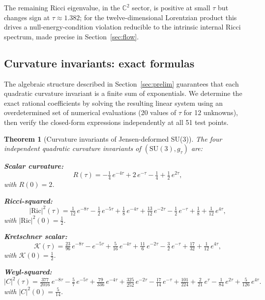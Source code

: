 \documentclass[12pt]{article}
\newtheorem{theorem}{Theorem}
\theoremstyle{definition}
\theoremstyle{remark}
\begin{document}
The remaining Ricci eigenvalue, in the $\mathbb{C}^2$ sector, is positive at small $\tau$ but changes sign at $\tau\approx1.382$; for the twelve-dimensional Lorentzian product this drives a null-energy-condition violation reducible to the intrinsic internal Ricci spectrum, made precise in Section~\ref{sec:flow}.

\subsection{Curvature invariants: exact formulas}

The algebraic structure described in Section~\ref{sec:prelim} guarantees that each quadratic curvature invariant is a finite sum of exponentials.  We determine the exact rational coefficients by solving the resulting linear system using an overdetermined set of numerical evaluations (20 values of $\tau$ for 12 unknowns), then verify the closed-form expressions independently at all 51 test points.

\begin{theorem}[Curvature invariants of Jensen-deformed SU(3)]
\label{thm:invariants}
The four independent quadratic curvature invariants of $(\mathrm{SU}(3),g_\tau)$ are:

\noindent\textbf{Scalar curvature:}
\begin{equation}
\label{eq:scalar}
R(\tau) = -\tfrac{1}{4}\,e^{-4\tau} + 2\,e^{-\tau} - \tfrac{1}{4} + \tfrac{1}{2}\,e^{2\tau},
\end{equation}
with $R(0)=2$.

\noindent\textbf{Ricci-squared:}
\begin{equation}
\label{eq:ricci_sq}
|\mathrm{Ric}|^2(\tau) = \tfrac{1}{12}\,e^{-8\tau} - \tfrac{1}{2}\,e^{-5\tau} + \tfrac{1}{8}\,e^{-4\tau} + \tfrac{13}{12}\,e^{-2\tau} - \tfrac{1}{2}\,e^{-\tau} + \tfrac{1}{8} + \tfrac{1}{12}\,e^{4\tau},
\end{equation}
with $|\mathrm{Ric}|^2(0) = \tfrac{1}{2}$.

\noindent\textbf{Kretschner scalar:}
\begin{equation}
\label{eq:kretschner}
\mathcal{K}(\tau) = \tfrac{23}{96}\,e^{-8\tau} - e^{-5\tau} + \tfrac{5}{16}\,e^{-4\tau} + \tfrac{11}{6}\,e^{-2\tau} - \tfrac{3}{2}\,e^{-\tau} + \tfrac{17}{32} + \tfrac{1}{12}\,e^{4\tau},
\end{equation}
with $\mathcal{K}(0) = \tfrac{1}{2}$.

\noindent\textbf{Weyl-squared:}
\begin{equation}
\label{eq:weyl_sq}
|C|^2(\tau) = \tfrac{377}{2016}\,e^{-8\tau} - \tfrac{5}{7}\,e^{-5\tau} + \tfrac{79}{336}\,e^{-4\tau} + \tfrac{325}{252}\,e^{-2\tau} - \tfrac{17}{14}\,e^{-\tau} + \tfrac{101}{224} + \tfrac{2}{21}\,e^{\tau} - \tfrac{1}{84}\,e^{2\tau} + \tfrac{5}{126}\,e^{4\tau}.
\end{equation}
with $|C|^2(0) = \tfrac{5}{14}$.
\end{theorem}
\end{document}
